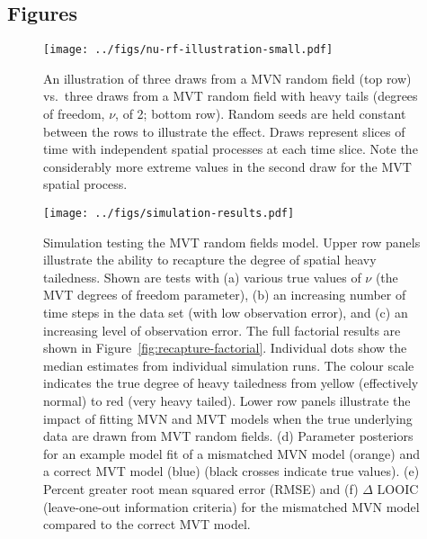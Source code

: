 \documentclass[12pt,english]{article}
\begin{document}
\begin{spacing}{1.3}


\clearpage

\section{Figures}

\begin{figure}[htb]
  \begin{center}
    \texttt{[image: ../figs/nu-rf-illustration-small.pdf]}
    \caption{An illustration of three draws from a MVN random field (top row)
      vs.\ three draws from a MVT random field with heavy tails
      (degrees of freedom, $\nu$, of 2; bottom row). Random seeds are held constant
      between the rows
      to illustrate the effect. Draws represent slices of time with independent spatial
      processes at each time slice. Note the considerably more extreme values in
      the second draw for the MVT spatial process.}
    \label{fig:nu}
  \end{center}
\end{figure}

\clearpage

\begin{figure}[htb]
  \begin{center}
    \texttt{[image: ../figs/simulation-results.pdf]}
    \caption{Simulation testing the MVT random fields model.
      Upper row
      panels illustrate the ability to recapture the
      degree of spatial heavy tailedness.
      Shown are tests with
      (a) various true values of $\nu$ (the MVT degrees of freedom parameter),
      (b) an increasing number of time steps in the data set (with low observation error),
      and (c) an increasing level of observation error.
      The full factorial results are shown in Figure~\ref{fig:recapture-factorial}.
      Individual dots show the median estimates from individual simulation runs.
      The colour scale indicates the true degree of heavy tailedness from
      yellow (effectively normal) to red (very heavy tailed).
      Lower row panels illustrate the impact of fitting MVN and MVT models
      when the true underlying data are drawn from MVT random fields.
      (d) Parameter posteriors for an
      example model fit of a mismatched MVN model (orange)
      and a correct MVT model (blue) (black crosses indicate true values).
      (e) Percent greater root mean squared error (RMSE)
      and (f) $\Delta$ LOOIC (leave-one-out information criteria)
      for the mismatched MVN model compared to the correct MVT model.
    }
    \label{fig:recapture}
  \end{center}
\end{figure}


\end{spacing}
\end{document}
